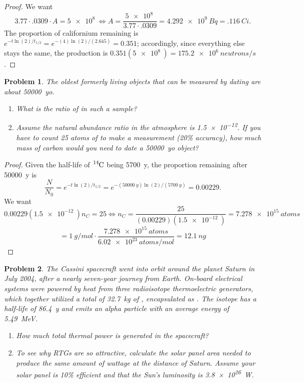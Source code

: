 \documentclass{article}
\newtheorem{plm}{Problem}
\begin{document}
\begin{proof}
  We want
  \[
    3.77 \cdot .0309   \cdot A = \SI{5e8}{}
    \Leftrightarrow A = \frac{\SI{5e8}{}}{3.77 \cdot .0309} = \SI{4.292e9}{Bq} = \SI{.116}{Ci}.
  \]
  The proportion of californium remaining is $e^{-t\ln(2)/t_{1/2}} = e^{-(4)\ln(2)/(2.645)} = 0.351$; accordingly, since everything else stays the same,
  the production is $0.351(\SI{5e8}{}) = \SI{175.2e6}{neutrons/s}$.
\end{proof}

\begin{plm}
  The oldest formerly living objects that can be measured by  dating are about \SI{50000}{yo}.
  \begin{enumerate}
  \item What is the ratio of  in such a sample?
  \item Assume the natural abundance ratio in the atmosphere is \SI{1.5e-12}{}.
    If you have to count 25 atoms of  to make a measurement (20\% accuracy),
    how much mass of carbon would you need to date a \SI{50000}{yo} object?
  \end{enumerate}
\end{plm}

\begin{proof}
  Given the half-life of $\ce{^{14}C}$ being \SI{5700}{y}, the proportion remaining after \SI{50000}{y} is
  \[
    \frac{N}{N_{0}} = e^{-t\ln(2)/t_{1/2}} = e^{-(\SI{50000}{y})\ln(2)/(\SI{5700}{y})} = 0.00229.
  \]
  We want
  \[
    0.00229(\SI{1.5e-12}{})n_{C} = 25
    \Leftrightarrow n_{C} = \frac{25}{(0.00229)(\SI{1.5e-12}{})} = \SI{7.278e15}{atoms}
  \]
  \[
    = \SI{1}{g/mol}\cdot \frac{\SI{7.278e15}{atoms}}{\SI{6.02e23}{atoms/mol}} = \SI{12.1}{ng}
  \]
\end{proof}

\begin{plm}
  The Cassini spacecraft went into orbit around the planet Saturn in July 2004, after a nearly seven-year journey from Earth.
  On-board electrical systems were powered by heat from three radioisotope thermoelectric generators,
  which together utilized a total of \SI{32.7}{kg} of , encapsulated as .
  The isotope has a half-life of \SI{86.4}{y} and emits an alpha particle with an average energy of \SI{5.49}{MeV}.
  \begin{enumerate}
  \item How much total thermal power is generated in the spacecraft?
  \item To see why RTGs are so attractive, calculate the solar panel area needed to produce the same amount of wattage at the distance of Saturn.
    Assume your solar panel is 10\% efficient and that the Sun's luminosity is \SI{3.8e26}{W}.
  \end{enumerate}
\end{plm}
\end{document}
